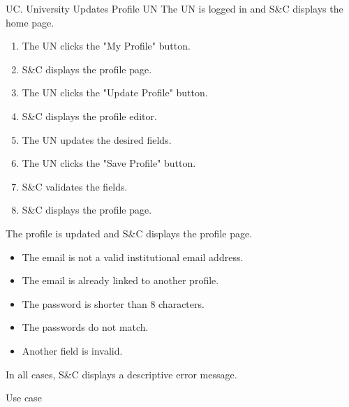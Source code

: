 \begin{usecase}
    {UC\theuc. University Updates Profile}
    {UN}
    {The UN is logged in and S\&C displays the home page.}
    {\begin{enumerate}[leftmargin=*]
        \item The UN clicks the "My Profile" button.
        \item S\&C displays the profile page.
        \item The UN clicks the "Update Profile" button.
        \item S\&C displays the profile editor.
        \item The UN updates the desired fields.
        \item The UN clicks the "Save Profile" button.
        \item S\&C validates the fields.
        \item S\&C displays the profile page.
    \end{enumerate}}
    {The profile is updated and S\&C displays the profile page.}
    {\begin{itemize}[leftmargin=*, label=\tiny\textbullet]
        \item The email is not a valid institutional email address.
        \item The email is already linked to another profile.
        \item The password is shorter than 8 characters.
        \item The passwords do not match.
        \item Another field is invalid.
    \end{itemize}
    In all cases, S\&C displays a descriptive error message.}
    {Use case \theuc}
\end{usecase}

